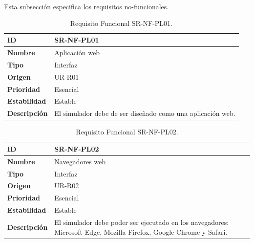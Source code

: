 Esta subsección especifica los requisitos no-funcionales.

\begin{center}
\begin{table}[htbp]
\centering
\begin{tabular}{@{}p{2.5cm} p{9cm}@{}} 
\toprule
\textbf{ID} 				& SR-NF-PL01 \\
\midrule
\textbf{Nombre} 			& Aplicación web \\
\midrule
\textbf{Tipo} 			& Interfaz \\
\midrule
\textbf{Origen} 			& UR-R01 \\
\midrule
\textbf{Prioridad}		& Esencial \\
\midrule
\textbf{Estabilidad} 		& Estable \\
\midrule
\textbf{Descripción} 	& El simulador debe de ser diseñado como una aplicación web. \\
\bottomrule
\end{tabular}
\caption{Requisito Funcional SR-NF-PL01.}
\label{tab:srnfpl01}
\end{table}
\end{center}

\begin{center}
\begin{table}[htbp]
\centering
\begin{tabular}{@{}p{2.5cm} p{9cm}@{}} 
\toprule
\textbf{ID} 				& SR-NF-PL02 \\
\midrule
\textbf{Nombre} 			& Navegadores web \\
\midrule
\textbf{Tipo} 			& Interfaz \\
\midrule
\textbf{Origen} 			& UR-R02 \\
\midrule
\textbf{Prioridad}		& Esencial \\
\midrule
\textbf{Estabilidad} 		& Estable \\
\midrule
\textbf{Descripción} 	& El simulador debe poder ser ejecutado en los navegadores: Microsoft Edge, Mozilla Firefox, Google Chrome y Safari. \\
\bottomrule
\end{tabular}
\caption{Requisito Funcional SR-NF-PL02.}
\label{tab:srnfpl02}
\end{table}
\end{center}

